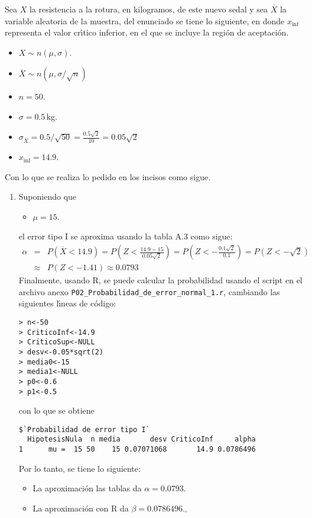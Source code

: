 \begin{solucion}
 Sea $X$ la resistencia a la rotura, en kilogramos, de este nuevo sedal y sea $\overline{X}$ la variable aleatoria de la muestra, del enunciado se tiene lo siguiente, en donde $x_{\text{inf}}$ representa el valor cr\'{\i}tico inferior, en el que se incluye la regi\'on de aceptaci\'on.
 \begin{itemize}
  \item $X \sim n(\mu,\sigma)$.
  \item $\overline{X} \sim n\left( \mu, \sigma/\sqrt{n} \right)$
  \item $n = 50$.
  \item $\sigma = 0.5\,$kg.
  \item $\sigma_{\overline{X}} = 0.5/\sqrt{50} = \frac{0.5\sqrt{2}}{10} = 0.05\sqrt{2}$
  \item $x_{\text{inf}} = 14.9$.
 \end{itemize}
 Con lo que se realiza lo pedido en los incisos como sigue.
 \begin{enumerate}
  \item Suponiendo que
  \begin{itemize}
   \item $\mu = 15$.
  \end{itemize}
  el error tipo I se aproxima usando la tabla A.3 como sigue:
  \begin{eqnarray*}
   \alpha & = & P(\overline{X} < 14.9) = P\left( Z < \frac{14.9-15}{0.05\sqrt{2}} \right) = P\left( Z < -\frac{0.1\sqrt{2}}{0.1} \right) = P\left( Z < -\sqrt{2} \right) \\
   & \approx & P(Z < -1.41) \approx 0.0793
  \end{eqnarray*}
  Finalmente, usando R, se puede calcular la probabilidad usando el script en el archivo anexo \texttt{P02\_Probabilidad\_de\_error\_normal\_1.r}, cambiando las siguientes l\'{\i}neas de c\'odigo:
  \begin{verbatim}
> n<-50
> CriticoInf<-14.9
> CriticoSup<-NULL
> desv<-0.05*sqrt(2)
> media0<-15
> media1<-NULL
> p0<-0.6
> p1<-0.5
  \end{verbatim}
  \vspace{-0.5cm}
  con lo que se obtiene
  \begin{verbatim}
$`Probabilidad de error tipo I`
  HipotesisNula  n media       desv CriticoInf     alpha
1      mu =  15 50    15 0.07071068       14.9 0.0786496
  \end{verbatim}
  \vspace{-0.5cm}
  Por lo tanto, se tiene lo siguiente:
  \begin{itemize}
   \item La aproximaci\'on las tablas da $\alpha = 0.0793$.
   \item La aproximaci\'on con R da $\beta = 0.0786496$.${}_{\square}$
  \end{itemize}


\end{enumerate}
\end{solucion}
